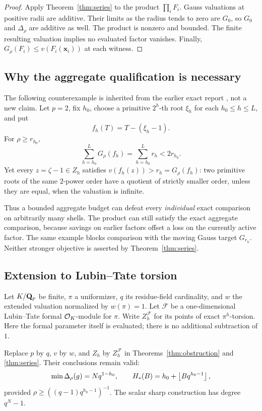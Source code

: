 \begin{proof}
Apply Theorem~\ref{thm:series} to the product \(\prod_iF_i\).
Gauss valuations at positive radii are additive. Their limits as the radius tends to zero are \(G_0\), so \(G_0\) and \(\Delta_\rho\) are additive as well. The product is nonzero and bounded. The finite resulting valuation implies no evaluated factor vanishes. Finally,
\(G_\rho(F_i)\le v(F_i(\mathbf x_i))\) at each witness.
\end{proof}

\subsection{Why the aggregate qualification is necessary}
The following counterexample is inherited from the earlier exact report \cite{exactprior}, not a new claim. Let \(p=2\), fix \(h_0\), choose a primitive \(2^h\)-th root \(\xi_h\) for each \(h_0\le h\le L\), and put
\[
 f_h(T)=T-(\xi_h-1).
\]
For \(\rho\ge r_{h_0}\),
\[
 \sum_{h=h_0}^L G_\rho(f_h)=\sum_{h=h_0}^L r_h<2r_{h_0}.
\]
Yet every \(z=\zeta-1\in Z_h\) satisfies
\(v(f_h(z))>r_h=G_\rho(f_h)\): two primitive roots of the same \(2\)-power order have a quotient of strictly smaller order, unless they are equal, when the valuation is infinite.

Thus a bounded aggregate budget can defeat every \emph{individual} exact comparison on arbitrarily many shells. The product can still satisfy the exact aggregate comparison, because savings on earlier factors offset a loss on the currently active factor. The same example blocks comparison with the moving Gauss target \(G_{r_h}\). Neither stronger objective is asserted by Theorem~\ref{thm:series}.

\subsection{Extension to Lubin--Tate torsion}
\label{subsec:lt}
Let \(K/\mathbf Q_p\) be finite, \(\pi\) a uniformizer, \(q\) its residue-field cardinality, and \(w\) the extended valuation normalized by \(w(\pi)=1\). Let \(\mathcal F\) be a one-dimensional Lubin--Tate formal \(\mathcal O_K\)-module for \(\pi\). Write \(Z_h^{\mathcal F}\) for its points of exact \(\pi^h\)-torsion. Here the formal parameter itself is evaluated; there is no additional subtraction of \(1\).

\begin{corollary}
\label{cor:lt}
Replace \(p\) by \(q\), \(v\) by \(w\), and \(Z_h\) by \(Z_h^{\mathcal F}\) in Theorems~\ref{thm:obstruction} and \ref{thm:series}. Their conclusions remain valid:
\[
 \min\Delta_\rho(g)=Nq^{1-h_0},\qquad
 H_*(B)=h_0+\left\lfloor Bq^{h_0-1}\right\rfloor,
\]
provided
\(\rho\ge((q-1)q^{h_0-1})^{-1}\).
The scalar sharp construction has degree \(q^N-1\).
\end{corollary}

